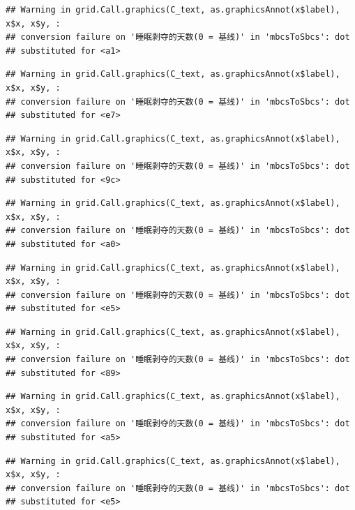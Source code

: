 \documentclass[
]{book}
\begin{document}
\begin{verbatim}
## Warning in grid.Call.graphics(C_text, as.graphicsAnnot(x$label), x$x, x$y, :
## conversion failure on '睡眠剥夺的天数(0 = 基线)' in 'mbcsToSbcs': dot
## substituted for <a1>
\end{verbatim}

\begin{verbatim}
## Warning in grid.Call.graphics(C_text, as.graphicsAnnot(x$label), x$x, x$y, :
## conversion failure on '睡眠剥夺的天数(0 = 基线)' in 'mbcsToSbcs': dot
## substituted for <e7>
\end{verbatim}

\begin{verbatim}
## Warning in grid.Call.graphics(C_text, as.graphicsAnnot(x$label), x$x, x$y, :
## conversion failure on '睡眠剥夺的天数(0 = 基线)' in 'mbcsToSbcs': dot
## substituted for <9c>
\end{verbatim}

\begin{verbatim}
## Warning in grid.Call.graphics(C_text, as.graphicsAnnot(x$label), x$x, x$y, :
## conversion failure on '睡眠剥夺的天数(0 = 基线)' in 'mbcsToSbcs': dot
## substituted for <a0>
\end{verbatim}

\begin{verbatim}
## Warning in grid.Call.graphics(C_text, as.graphicsAnnot(x$label), x$x, x$y, :
## conversion failure on '睡眠剥夺的天数(0 = 基线)' in 'mbcsToSbcs': dot
## substituted for <e5>
\end{verbatim}

\begin{verbatim}
## Warning in grid.Call.graphics(C_text, as.graphicsAnnot(x$label), x$x, x$y, :
## conversion failure on '睡眠剥夺的天数(0 = 基线)' in 'mbcsToSbcs': dot
## substituted for <89>
\end{verbatim}

\begin{verbatim}
## Warning in grid.Call.graphics(C_text, as.graphicsAnnot(x$label), x$x, x$y, :
## conversion failure on '睡眠剥夺的天数(0 = 基线)' in 'mbcsToSbcs': dot
## substituted for <a5>
\end{verbatim}

\begin{verbatim}
## Warning in grid.Call.graphics(C_text, as.graphicsAnnot(x$label), x$x, x$y, :
## conversion failure on '睡眠剥夺的天数(0 = 基线)' in 'mbcsToSbcs': dot
## substituted for <e5>
\end{verbatim}
\end{document}
